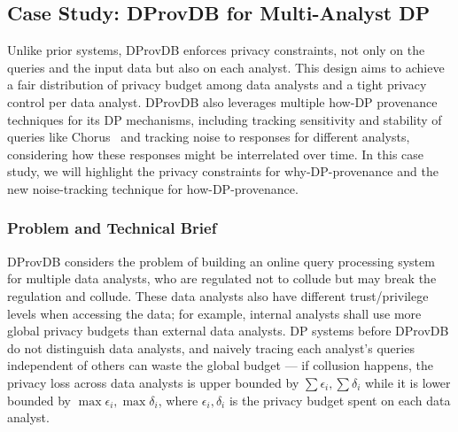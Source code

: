 \subsection{Case Study: DProvDB for Multi-Analyst DP}
Unlike prior systems, DProvDB enforces privacy constraints, not only on the queries and the input data but also on each analyst. This design aims to achieve a fair distribution of privacy budget among data analysts and a tight privacy control per data analyst. DProvDB also leverages multiple how-DP provenance techniques for its DP mechanisms, including tracking sensitivity and stability of queries like Chorus~\cite{johnson2020chorus} and tracking noise to responses for different analysts, considering how these responses might be interrelated over time.
In this case study, we will highlight the privacy constraints for why-DP-provenance and the new noise-tracking technique for how-DP-provenance.


\subsubsection{Problem and Technical Brief}
DProvDB considers the problem of building an online query processing system for multiple data analysts, who are regulated not to collude but may break the regulation and collude. These data analysts also have different trust/privilege levels when accessing the data; for example, internal analysts shall use more global privacy budgets than external data analysts.
DP systems before DProvDB do not distinguish data analysts, and naively tracing each analyst's queries independent of others can waste the global budget --- if collusion happens, the privacy loss across data analysts is upper bounded by $\sum \epsilon_i, \sum \delta_i$ while it is lower bounded by $\max \epsilon_i, \max \delta_i$, where $\epsilon_i, \delta_i$ is the privacy budget spent on each data analyst.


